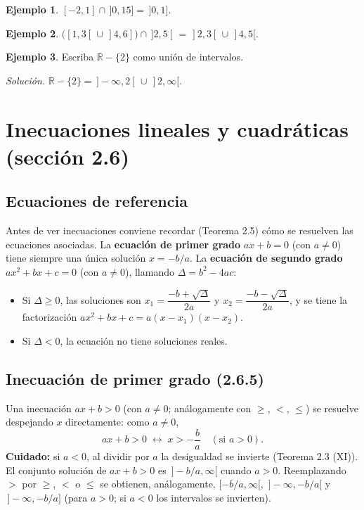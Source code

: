 \documentclass[11pt]{article}
\theoremstyle{plain}
\theoremstyle{definition}
\newtheorem{ejemplo}{Ejemplo}
\begin{document}
\begin{ejemplo}
$[-2,1] \cap \,]0,15] = \,]0,1]$.
\end{ejemplo}

\begin{ejemplo}
$\big([1,3[\, \cup \,]4,6]\big) \cap \,]2,5[\, = \,]2,3[\, \cup \,]4,5[$.
\end{ejemplo}

\begin{ejemplo}
Escriba $\mathbb{R} - \{2\}$ como unión de intervalos.

\emph{Solución.} $\mathbb{R}-\{2\} = \,]-\infty,2[\, \cup \,]2,\infty[$.
\end{ejemplo}

\section{Inecuaciones lineales y cuadráticas (sección 2.6)}

\subsection{Ecuaciones de referencia}

Antes de ver inecuaciones conviene recordar (Teorema 2.5) cómo se resuelven las ecuaciones
asociadas. La \textbf{ecuación de primer grado} $ax+b=0$ (con $a\neq 0$) tiene siempre una única
solución $x=-b/a$. La \textbf{ecuación de segundo grado} $ax^2+bx+c=0$ (con $a\neq 0$), llamando
$\Delta = b^2-4ac$:
\begin{itemize}[nosep]
  \item Si $\Delta \ge 0$, las soluciones son $x_1 = \dfrac{-b+\sqrt{\Delta}}{2a}$ y
  $x_2 = \dfrac{-b-\sqrt{\Delta}}{2a}$, y se tiene la factorización $ax^2+bx+c = a(x-x_1)(x-x_2)$.
  \item Si $\Delta < 0$, la ecuación no tiene soluciones reales.
\end{itemize}

\subsection{Inecuación de primer grado (2.6.5)}

Una inecuación $ax+b>0$ (con $a\neq 0$; análogamente con $\ge$, $<$, $\le$) se resuelve despejando
$x$ directamente: como $a\neq 0$,
\[
  ax+b>0 \;\leftrightarrow\; x>-\frac{b}{a} \quad (\text{si } a>0).
\]
\textbf{Cuidado:} si $a<0$, al dividir por $a$ la desigualdad se invierte (Teorema 2.3 (XI)). El
conjunto solución de $ax+b>0$ es $\,]-b/a,\infty[$ cuando $a>0$. Reemplazando $>$ por $\ge$, $<$ o
$\le$ se obtienen, análogamente, $[-b/a,\infty[$, $\,]-\infty,-b/a[$ y $\,]-\infty,-b/a]$
(para $a>0$; si $a<0$ los intervalos se invierten).
\end{document}
